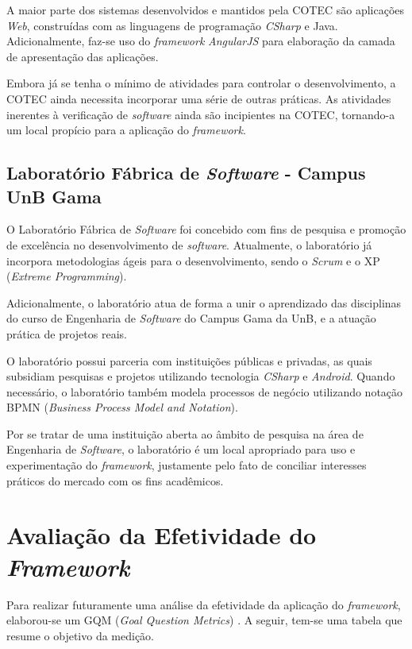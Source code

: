 A maior parte dos sistemas desenvolvidos e mantidos pela COTEC são aplicações \textit{Web}, construídas com as linguagens de programação \textit{CSharp} e Java. Adicionalmente, faz-se uso do \textit{framework} \textit{AngularJS} para elaboração da camada de apresentação das aplicações.

Embora já se tenha o mínimo de atividades para controlar o desenvolvimento, a COTEC ainda necessita incorporar uma série de outras práticas. As atividades inerentes à verificação de \textit{software} ainda são incipientes na COTEC, tornando-a um local propício para a aplicação do \textit{framework}.

\subsection{Laboratório Fábrica de \textit{Software} - Campus UnB Gama}

O Laboratório Fábrica de \textit{Software} foi concebido com fins de pesquisa e promoção de excelência no desenvolvimento de \textit{software}. Atualmente, o laboratório já incorpora metodologias ágeis para o desenvolvimento, sendo o \textit{Scrum} e o XP (\textit{Extreme Programming}).

Adicionalmente, o laboratório atua de forma a unir o aprendizado das disciplinas do curso de Engenharia de \textit{Software} do Campus Gama da UnB, e a atuação prática de projetos reais.

O laboratório possui parceria com instituições públicas e privadas, as quais subsidiam pesquisas e projetos utilizando tecnologia \textit{CSharp} e \textit{Android}. Quando necessário, o laboratório também modela processos de negócio utilizando notação BPMN (\textit{Business Process Model and Notation}).

Por se tratar de uma instituição aberta ao âmbito de pesquisa na área de Engenharia de \textit{Software}, o laboratório é um local apropriado para uso e experimentação do \textit{framework}, justamente pelo fato de conciliar interesses práticos do mercado com os fins acadêmicos.

\section{Avaliação da Efetividade do \textit{Framework}}

Para realizar futuramente uma análise da efetividade da aplicação do \textit{framework}, elaborou-se um GQM (\textit{Goal Question Metrics}) \cite{gqm}. A seguir, tem-se uma tabela que resume o objetivo da medição.

